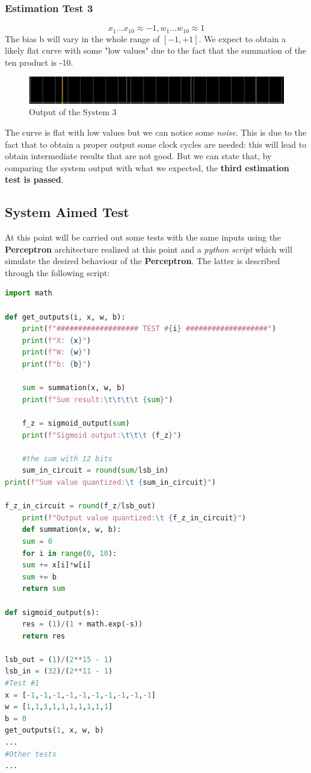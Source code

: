\subsubsection{Estimation Test 3}
\begin{equation}
	x_{1} \dots x_{10} \approx -1, w_{1} \dots w_{10} \approx 1
\end{equation}
The bias b will vary in the whole range of $[-1, +1]$. We expect to obtain a likely flat curve with some "low values" due to the fact that the summation of the ten product is -10.
\begin{figure}[H]
	\centering
	\caption{Output of the System 3}
	\includegraphics[width=\textwidth]{img/est_test_3.png}
\end{figure}
The curve is flat with low values but we can notice some \textit{noise}. This is due to the fact that to obtain a proper output some clock cycles are needed: this will lead to obtain intermediate results that are not good. But we can state that, by comparing the system output with what we expected, the \textbf{third estimation test is passed}.
\subsection{System Aimed Test}
At this point will be carried out some tests with the same inputs using the \textbf{Perceptron} architecture realized at this point and a \textit{python script} which will simulate the desired behaviour of the \textbf{Perceptron}. The latter is described through the following script:

\begin{lstlisting}[language=python]
import math

def get_outputs(i, x, w, b):
	print(f"################### TEST #{i} ###################")
	print(f"X: {x}")
	print(f"W: {w}")
	print(f"b: {b}")
	
	sum = summation(x, w, b)
	print(f"Sum result:\t\t\t\t {sum}")
	
	f_z = sigmoid_output(sum)
	print(f"Sigmoid output:\t\t\t {f_z}")
	
	#the sum with 12 bits
	sum_in_circuit = round(sum/lsb_in)
print(f"Sum value quantized:\t {sum_in_circuit}")

f_z_in_circuit = round(f_z/lsb_out)
	print(f"Output value quantized:\t {f_z_in_circuit}")
	def summation(x, w, b):
	sum = 0
	for i in range(0, 10):
	sum += x[i]*w[i]
	sum += b
	return sum

def sigmoid_output(s):
	res = (1)/(1 + math.exp(-s))
	return res

lsb_out = (1)/(2**15 - 1)
lsb_in = (32)/(2**11 - 1)
#Test #1
x = [-1,-1,-1,-1,-1,-1,-1,-1,-1,-1]
w = [1,1,1,1,1,1,1,1,1,1]
b = 0
get_outputs(1, x, w, b)
...
#Other tests
...
\end{lstlisting}

